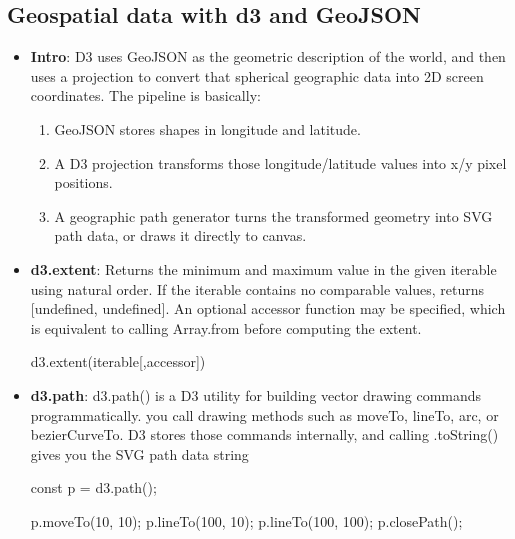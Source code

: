 \documentclass{report}
\begin{document}
    \pagebreak 
    \subsection{Geospatial data with d3 and GeoJSON}
    \begin{itemize}
        \item \textbf{Intro}: D3 uses GeoJSON as the geometric description of the world, and then uses a projection to convert that spherical geographic data into 2D screen coordinates.
            \bigbreak \noindent 
            The pipeline is basically:
            \begin{enumerate}
                \item GeoJSON stores shapes in longitude and latitude.
                \item A D3 projection transforms those longitude/latitude values into x/y pixel positions.
                \item A geographic path generator turns the transformed geometry into SVG path data, or draws it directly to canvas.
            \end{enumerate}
        \item \textbf{d3.extent}: Returns the minimum and maximum value in the given iterable using natural order. If the iterable contains no comparable values, returns [undefined, undefined]. An optional accessor function may be specified, which is equivalent to calling Array.from before computing the extent.
            \bigbreak \noindent 
            \begin{jscode}
                d3.extent(iterable[,accessor])
            \end{jscode}
        \item \textbf{d3.path}: d3.path() is a D3 utility for building vector drawing commands programmatically. you call drawing methods such as moveTo, lineTo, arc, or bezierCurveTo.
            \bigbreak \noindent 
            D3 stores those commands internally, and calling .toString() gives you the SVG path data string
            \bigbreak \noindent 
            \begin{jscode}
                const p = d3.path();

                p.moveTo(10, 10);
                p.lineTo(100, 10);
                p.lineTo(100, 100);
                p.closePath();


\end{jscode}
\end{itemize}
\end{document}

